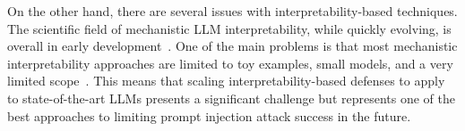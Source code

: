 On the other hand, there are several issues with interpretability-based techniques.
The scientific field of mechanistic LLM interpretability, while quickly evolving, is overall in early development~\cite{saphra_mechanistic_2024, rai_practical_2024}.
One of the main problems is that most mechanistic interpretability approaches are limited to toy examples, small models, and a very limited scope~\cite{rai_practical_2024}.
This means that scaling interpretability-based defenses to apply to state-of-the-art LLMs presents a significant challenge but represents one of the best approaches to limiting prompt injection attack success in the future.